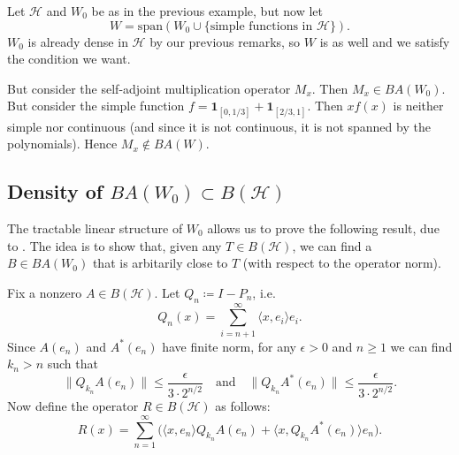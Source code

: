 \documentclass[12pt]{article}
\begin{document}
\begin{example}
	Let $\mathcal{H}$ and $W_0$ be as in the previous example, but now let 
	\begin{equation*}
		W=\text{span}(W_0\cup\{\text{simple functions in } \mathcal{H}\}).
	\end{equation*} 
	$W_0$ is already dense in $\mathcal{H}$ by our previous remarks, so $W$ is as well and we satisfy the condition we want.

	But consider the self-adjoint multiplication operator $M_x$. Then $M_x\in BA(W_0)$. But consider the simple function $f=\mathbf{1}_{[0,1/3]}+\mathbf{1}_{[2/3, 1]}$. Then $xf(x)$ is neither simple nor continuous (and since it is not continuous, it is not spanned by the polynomials). Hence $M_x\not\in BA(W)$.
\end{example}

% 


\subsection{Density of $BA(W_0) \subset B(\mathcal{H})$} %

The tractable linear structure of $W_0$ allows us to prove the following result, due to \cite{szwarc_2022}. The idea is to show that, given any $T\in B(\mathcal{H})$, we can find a $B\in BA(W_0)$ that is arbitarily close to $T$ (with respect to the operator norm).

Fix a nonzero $A\in B(\mathcal{H})$. Let $Q_n\coloneqq I - P_n$, i.e. 
	\begin{equation*}
		Q_n(x) = \sum_{i=n+1}^\infty \langle x, e_i \rangle e_i.
	\end{equation*}
	Since $A(e_n)$ and $A^\ast(e_n)$ have finite norm, for any $\epsilon>0$ and $n\geq 1$ we can find $k_n > n$ such that 
	\begin{equation*}
		\|Q_{k_n}A(e_n)\| \leq \frac{\epsilon}{3\cdot 2^{n/2}} \quad \text{and} \quad \|Q_{k_n}A^\ast(e_n)\| \leq \frac{\epsilon}{3\cdot 2^{n/2}}.
	\end{equation*}
	Now define the operator $R\in B(\mathcal{H})$ as follows:
	\begin{equation*}
		R(x) = \sum_{n=1}^\infty \Big( \langle x, e_n \rangle Q_{k_n}A(e_n) + \langle x, Q_{k_n}A^\ast(e_n) \rangle e_n \Big).
	\end{equation*}
\end{document}
